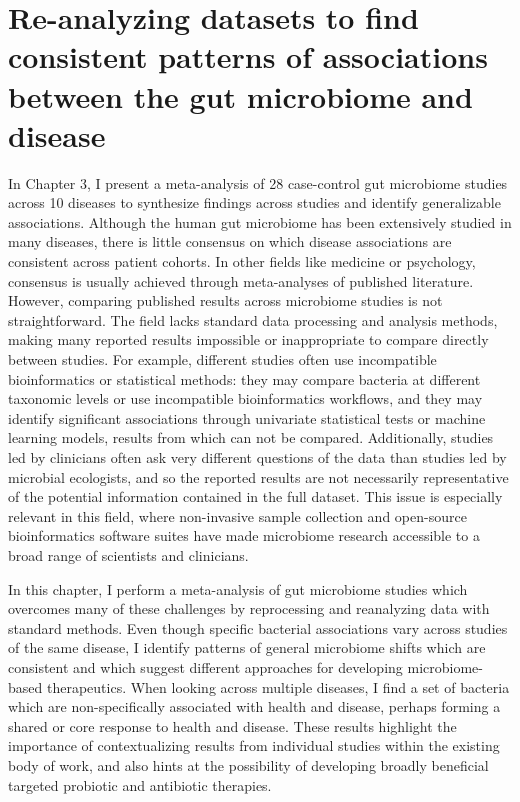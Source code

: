 \section{Re-analyzing datasets to find consistent patterns of associations between the gut microbiome and disease}

In Chapter 3, I present a meta-analysis of 28 case-control gut microbiome studies across 10 diseases to synthesize findings across studies and identify generalizable associations.
Although the human gut microbiome has been extensively studied in many diseases, there is little consensus on which disease associations are consistent across patient cohorts.
In other fields like medicine or psychology, consensus is usually achieved through meta-analyses of published literature.
However, comparing published results across microbiome studies is not straightforward.
The field lacks standard data processing and analysis methods, making many reported results impossible or inappropriate to compare directly between studies.
For example, different studies often use incompatible bioinformatics or statistical methods: they may compare bacteria at different taxonomic levels or use incompatible bioinformatics workflows, and they may identify significant associations through univariate statistical tests or machine learning models, results from which can not be compared.
Additionally, studies led by clinicians often ask very different questions of the data than studies led by microbial ecologists, and so the reported results are not necessarily representative of the potential information contained in the full dataset.
This issue is especially relevant in this field, where non-invasive sample collection and open-source bioinformatics software suites have made microbiome research accessible to a broad range of scientists and clinicians.

In this chapter, I perform a meta-analysis of gut microbiome studies which overcomes many of these challenges by reprocessing and reanalyzing data with standard methods.
Even though specific bacterial associations vary across studies of the same disease, I identify patterns of general microbiome shifts which are consistent  and which suggest different approaches for developing microbiome-based therapeutics.
When looking across multiple diseases, I find a set of bacteria which are non-specifically associated with health and disease, perhaps forming a shared or core response to health and disease.
These results highlight the importance of contextualizing results from individual studies within the existing body of work, and also hints at the possibility of developing broadly beneficial targeted probiotic and antibiotic therapies.

